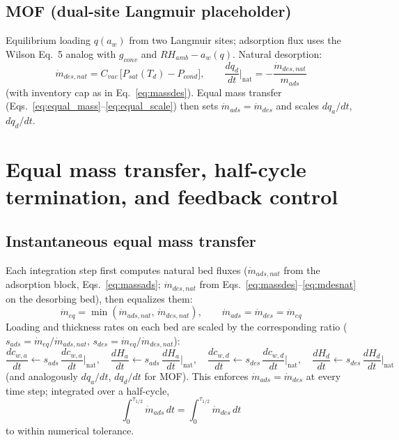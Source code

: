\documentclass[11pt]{article}
\begin{document}
\subsection{MOF (dual-site Langmuir placeholder)}

Equilibrium loading $q(a_w)$ from two Langmuir sites; adsorption flux uses the Wilson Eq.~5 analog with $g_{conv}$ and $RH_{amb} - a_w(q)$. Natural desorption:
\begin{equation}
\dot{m}_{des,nat} = C_{vac}\,\bigl[P_{sat}(T_d) - P_{cond}\bigr],
\qquad
\frac{dq_d}{dt}\Big|_{\mathrm{nat}} = -\frac{\dot{m}_{des,nat}}{m_{ads}}
\end{equation}
(with inventory cap as in Eq.~\eqref{eq:massdes}). Equal mass transfer (Eqs.~\eqref{eq:equal_mass}--\eqref{eq:equal_scale}) then sets $\dot{m}_{ads}=\dot{m}_{des}$ and scales $dq_a/dt$, $dq_d/dt$.

\section{Equal mass transfer, half-cycle termination, and feedback control}

\subsection{Instantaneous equal mass transfer}

Each integration step first computes natural bed fluxes
($\dot{m}_{ads,nat}$ from the adsorption block, Eqs.~\eqref{eq:massads};
$\dot{m}_{des,nat}$ from Eqs.~\eqref{eq:massdes}--\eqref{eq:mdesnat} on the desorbing bed),
then equalizes them:
\begin{equation}
\dot{m}_{eq} = \min(\dot{m}_{ads,nat},\, \dot{m}_{des,nat}),
\qquad
\dot{m}_{ads} = \dot{m}_{des} = \dot{m}_{eq}
\label{eq:equal_mass}
\end{equation}
Loading and thickness rates on each bed are scaled by the corresponding ratio
($s_{ads} = \dot{m}_{eq}/\dot{m}_{ads,nat}$, $s_{des} = \dot{m}_{eq}/\dot{m}_{des,nat}$):
\begin{equation}
\frac{dc_{w,a}}{dt} \leftarrow s_{ads}\,\frac{dc_{w,a}}{dt}\Big|_{\mathrm{nat}},
\quad
\frac{dH_a}{dt} \leftarrow s_{ads}\,\frac{dH_a}{dt}\Big|_{\mathrm{nat}},
\quad
\frac{dc_{w,d}}{dt} \leftarrow s_{des}\,\frac{dc_{w,d}}{dt}\Big|_{\mathrm{nat}},
\quad
\frac{dH_d}{dt} \leftarrow s_{des}\,\frac{dH_d}{dt}\Big|_{\mathrm{nat}}
\label{eq:equal_scale}
\end{equation}
(and analogously $dq_a/dt$, $dq_d/dt$ for MOF).
This enforces $\dot{m}_{ads} = \dot{m}_{des}$ at every time step; integrated over a half-cycle,
\begin{equation}
\int_0^{\tau_{1/2}} \dot{m}_{ads}\,dt = \int_0^{\tau_{1/2}} \dot{m}_{des}\,dt
\label{eq:cycle}
\end{equation}
to within numerical tolerance.
\end{document}

